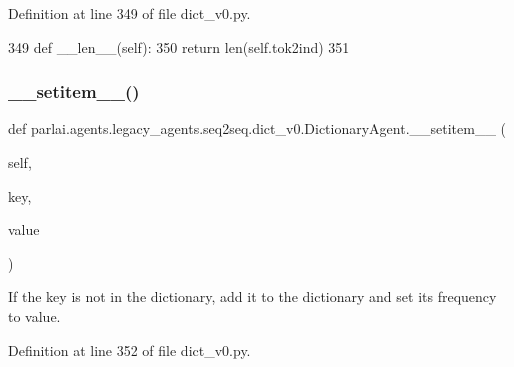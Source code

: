 Definition at line 349 of file dict\+\_\+v0.\+py.


\begin{DoxyCode}
349     \textcolor{keyword}{def }\_\_len\_\_(self):
350         \textcolor{keywordflow}{return} len(self.tok2ind)
351 
\end{DoxyCode}
\mbox{\label{classparlai_1_1agents_1_1legacy__agents_1_1seq2seq_1_1dict__v0_1_1DictionaryAgent_af234fbce75cd277f03b20688f7ba0e52}} 
\subsubsection{\texorpdfstring{\+\_\+\+\_\+setitem\+\_\+\+\_\+()}{\_\_setitem\_\_()}}
{\footnotesize\ttfamily def parlai.\+agents.\+legacy\+\_\+agents.\+seq2seq.\+dict\+\_\+v0.\+Dictionary\+Agent.\+\_\+\+\_\+setitem\+\_\+\+\_\+ (\begin{DoxyParamCaption}\item[{}]{self,  }\item[{}]{key,  }\item[{}]{value }\end{DoxyParamCaption})}

\begin{DoxyVerb}If the key is not in the dictionary, add it to the dictionary and set its
frequency to value.
\end{DoxyVerb}
 

Definition at line 352 of file dict\+\_\+v0.\+py.


